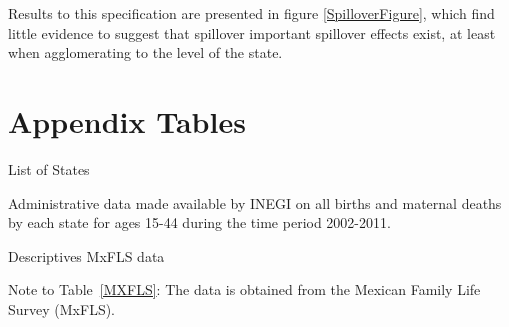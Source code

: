 \documentclass[a4paper, 11pt]{article}
\renewcommand{\thetable}{A\arabic{table}}
\renewcommand{\thefigure}{A\arabic{figure}}
\begin{document}
\begin{spacing}{1.4}
Results to this specification are presented in figure \ref{SpilloverFigure}, which
find little evidence to suggest that spillover important spillover effects exist, at
least when agglomerating to the level of the state. 


\renewcommand{\thetable}{A\arabic{table}}
\setcounter{table}{0}
\renewcommand{\thefigure}{A\arabic{figure}}
\setcounter{figure}{0}


\section{Appendix Tables}
\begin{table}[H]
   \caption{List of States}\label{list_of_states}
   \begin{threeparttable}
     
           {\footnotesize
             \begin{tablenotes}
	     \item Administrative data made available by INEGI on all births and maternal deaths by each state for ages 15-44 during the time period 2002-2011.
           \end{tablenotes}}
   \end{threeparttable}
\end{table}
 
\begin{table}[H]
   \caption{Descriptives MxFLS data}\label{MXFLS}
   \begin{threeparttable}
     {\footnotesize
       }
     {\scriptsize 	
       \begin{tablenotes}
       \item Note to Table~\ref{MXFLS}: The data is obtained from the Mexican Family Life Survey (MxFLS).   
     \end{tablenotes}}  
   \end{threeparttable}
\end{table}



\end{spacing}
\end{document}
